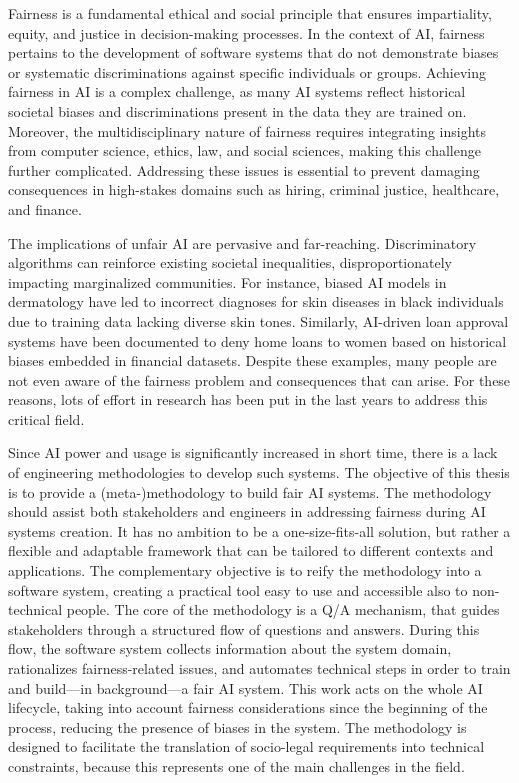 \documentclass[12pt,a4paper,openright,twoside]{book}
\begin{document}
Fairness is a fundamental ethical and social principle that ensures impartiality, equity, and justice in decision-making processes.
%
In the context of \acf{AI}, fairness pertains to the development of software systems that do not demonstrate biases or systematic discriminations against specific individuals or groups.
%
Achieving fairness in \ac{AI} is a complex challenge, as many \ac{AI} systems reflect historical societal biases and discriminations present in the data they are trained on.
%
Moreover, the multidisciplinary nature of fairness requires integrating insights from computer science, ethics, law, and social sciences, making this challenge further complicated.
%
Addressing these issues is essential to prevent damaging consequences in high-stakes domains such as hiring, criminal justice, healthcare, and finance.


The implications of unfair \ac{AI} are pervasive and far-reaching.
%
Discriminatory algorithms can reinforce existing societal inequalities, disproportionately impacting marginalized communities.
%
For instance, biased AI models in dermatology have led to incorrect diagnoses for skin diseases in black individuals due to training data lacking diverse skin tones.
%
Similarly, AI-driven loan approval systems have been documented to deny home loans to women based on historical biases embedded in financial datasets.
%
Despite these examples, many people are not even aware of the fairness problem and consequences that can arise.
%
For these reasons, lots of effort in research has been put in the last years to address this critical field.

Since \ac{AI} power and usage is significantly increased in short time, there is a lack of engineering methodologies to develop such systems.
%
The objective of this thesis is to provide a (meta-)methodology to build fair \ac{AI} systems.
%
The methodology should assist both stakeholders and engineers in addressing fairness during \ac{AI} systems creation.
%
It has no ambition to be a one-size-fits-all solution, but rather a flexible and adaptable framework that can be tailored to different contexts and applications.
%
The complementary objective is to reify the methodology into a software system, creating a practical tool easy to use and accessible also to non-technical people.
%
The core of the methodology is a \acf{Q/A} mechanism, that guides stakeholders through a structured flow of questions and answers.
%
During this flow, the software system collects information about the system domain, rationalizes fairness-related issues, and automates technical steps in order to train and build---in background---a fair \ac{AI} system.
%
This work acts on the whole \ac{AI} lifecycle, taking into account fairness considerations since the beginning of the process, reducing the presence of biases in the system.
%
The methodology is designed to facilitate the translation of socio-legal requirements into technical constraints, because this represents one of the main challenges in the field.
\end{document}
